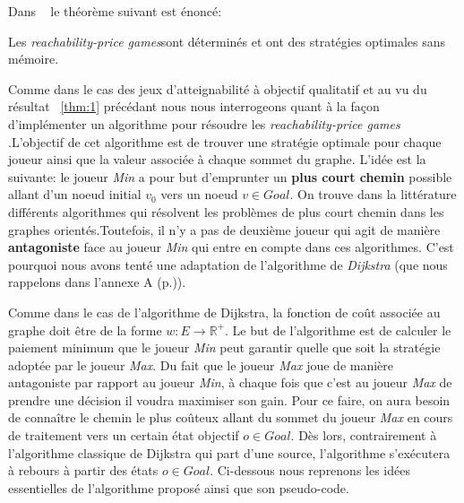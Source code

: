 


Dans ~\cite{DBLP:conf/lfcs/BrihayePS13} le théorème suivant est énoncé:

\begin{thm}
	\label{thm:1}
	Les \og\textit{reachability-price games}\fg sont déterminés et ont des stratégies optimales sans mémoire.
\end{thm}


Comme dans le cas des jeux d'atteignabilité à objectif qualitatif et au vu du résultat ~\ref{thm:1} précédant nous nous interrogeons quant à la façon d'implémenter un algorithme pour résoudre les \textit \og \textit{reachability-price games} \fg.L'objectif de cet algorithme est de trouver une stratégie optimale pour chaque joueur ainsi que la valeur associée à chaque sommet du graphe. L'idée est la suivante: le joueur \textit{Min} a pour but d'emprunter un \textbf{plus court chemin} possible allant d'un noeud initial $v_{0}$ vers un noeud $v \in Goal$. On trouve dans la littérature différents algorithmes qui résolvent les problèmes de plus court chemin dans les graphes orientés.Toutefois, il n'y a pas de deuxième joueur qui agit de manière \textbf{antagoniste} face au joueur \textit{Min} qui entre en compte dans ces algorithmes. C'est pourquoi nous avons tenté une adaptation de l'algorithme de \textit{Dijkstra} (que nous rappelons dans l'annexe A (p.\pageref{algo:dijkstra})).

Comme dans le cas de l'algorithme de Dijkstra, la fonction de coût associée au graphe doit être de la forme $w : E \rightarrow \mathbb{R}^{+}$. Le but de l'algorithme est de calculer le paiement minimum que le joueur \textit{Min} peut garantir quelle que soit la stratégie adoptée par le joueur \textit{Max}. Du fait que le joueur \textit{Max} joue de manière antagoniste par rapport au joueur \textit{Min}, à chaque fois que c'est au joueur \textit{Max} de prendre une décision il voudra maximiser son gain. Pour ce faire, on aura besoin de connaître le chemin le plus coûteux allant du sommet du joueur \textit{Max} en cours de traitement vers un certain état objectif $o \in Goal$. Dès lors, contrairement à l'algorithme classique de Dijkstra qui part d'une source, l'algorithme s'exécutera à rebours à partir des états $o \in Goal$. Ci-dessous nous reprenons les idées essentielles de l'algorithme proposé ainsi que son pseudo-code.\\

